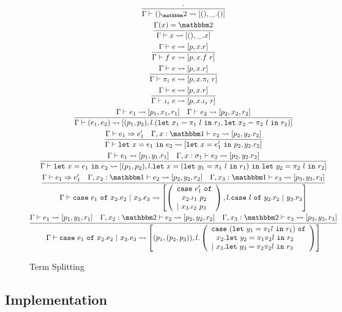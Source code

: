 \documentclass[11pt]{article}
\newcommand {\bbone} {\mathbbm 1}
\newcommand {\bbtwo} {\mathbbm 2}
\newcommand {\letin} [3] {{\tt let}~{#1} = {#2}~{\tt in}~{#3}}
\newcommand {\caseof} [3] {{\tt case}~{#1} ~{\tt of}~{#2}~{\tt |}~{#3}}
\newcommand {\tallcase} [3] {\begin{array}{l} {\tt case}~{#1} ~{\tt of}\\~~{#2}\\{\tt |}~{#3} \end{array}}
\newcommand {\splits} {\rightsquigarrow}
\newcommand {\inferenceSpacing}{\setlength{\jot}{1.8ex}}
\begin{document}
\begin{figure*}
\caption{Term Splitting}
\label{fig:splitting}
\inferenceSpacing
\begin{gather}
\infer {\Gamma \vdash ()_\bbtwo \splits [(),\_.()]}{\cdot} \\
\infer {\Gamma\vdash x \splits [(),\_.x]}{\Gamma(x) = \bbtwo}\\
\infer {\Gamma \vdash f~e \splits [p,x.f~r]}{\Gamma \vdash e \splits [p,x.r]} \\
\infer {\Gamma \vdash \pi_i~e \splits [p,x.\pi_i~r]}{\Gamma \vdash e \splits [p,x.r]} \\
\infer {\Gamma \vdash \iota_i~e \splits [p,x.\iota_i~r]}{\Gamma \vdash e \splits [p,x.r]} \\
\infer {\Gamma \vdash (e_1,e_2) \splits [(p_1,p_2), l.(\letin{x_1}{\pi_1~l}{r_1},\letin{x_2}{\pi_2~l}{r_2})]}{\Gamma \vdash e_1 \splits [p_1,x_1,r_1] & \Gamma \vdash e_2 \splits [p_2,x_2,r_2]} \\
\infer {\Gamma\vdash \letin {x}{e_1}{e_2} \splits [\letin {x}{e'_1}{p_2}, y_2.r_2] }{\Gamma\vdash e_1 \Rightarrow e_1' & \Gamma, x:\bbone \vdash e_2 \splits [p_2,y_2.r_2]} \\
\infer { \Gamma\vdash \letin {x}{e_1}{e_2}  \splits [(p_1,p_2), l.\letin {x}{(\letin {y_1}{\pi_1~l}{r_1})}{\letin {y_2}{\pi_2~l}{r_2}}] }{\Gamma\vdash e_1 \splits [p_1,y_1.r_1] & \Gamma, x:\sigma_1 \vdash e_2 \splits [p_2,y_2.r_2]} \\
\infer 
	{\Gamma\vdash \caseof {e_1}{x_2.e_2}{x_3.e_3} \splits \left[\left(\tallcase {e_1'}{x_2.\iota_1~p_2}{x_3.\iota_2~p_3}\right), l.\caseof{l}{y_2.r_2}{y_3.r_3}\right]}
	{\Gamma\vdash e_1 \Rightarrow e_1' 
	& \Gamma,x_2:\bbone \vdash e_2 \splits [p_2,y_2,r_2] 
	& \Gamma,x_3:\bbone \vdash e_3 \splits [p_3,y_3,r_3]} \\
\infer 
	{\Gamma\vdash \caseof {e_1}{x_2.e_2}{x_3.e_3} \splits \left[(p_1,(p_2,p_3)), l.
		\left(\tallcase{(\letin {y_1}{\pi_1 l}{r_1})}{x_2.\letin {y_2}{\pi_1\pi_2 l}{r_2}} {x_3.\letin {y_3}{\pi_2\pi_2 l}{r_3}} \right)
	\right] }
	{ \Gamma \vdash e_1 \splits [p_1,y_1,r_1]
	& \Gamma,x_2:\bbtwo \vdash e_2 \splits [p_2,y_2,r_2] 
	& \Gamma,x_3:\bbtwo \vdash e_3 \splits [p_3,y_3,r_3]} 
\end{gather}
\end{figure*}

\subsection{Implementation}
\end{document}
